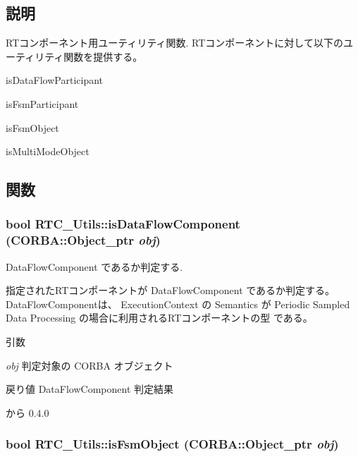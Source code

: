 \subsection{説明}
RTコンポーネント用ユーティリティ関数. RTコンポーネントに対して以下のユーティリティ関数を提供する。


\begin{DoxyItemize}
\item isDataFlowParticipant
\item isFsmParticipant
\item isFsmObject
\item isMultiModeObject 
\end{DoxyItemize}

\subsection{関数}
\subsubsection[{isDataFlowComponent}]{\setlength{\rightskip}{0pt plus 5cm}bool RTC\_\-Utils::isDataFlowComponent (CORBA::Object\_\-ptr {\em obj})}\label{namespaceRTC__Utils_a7615b39670d055183b4dba9a8166c868}


DataFlowComponent であるか判定する. 

指定されたRTコンポーネントが DataFlowComponent であるか判定する。 DataFlowComponentは、 ExecutionContext の Semantics が Periodic Sampled Data Processing の場合に利用されるRTコンポーネントの型 である。


\begin{DoxyParams}{引数}
\item[{\em obj}]判定対象の CORBA オブジェクト\end{DoxyParams}
\begin{DoxyReturn}{戻り値}
DataFlowComponent 判定結果
\end{DoxyReturn}
\begin{DoxySince}{から}
0.4.0 
\end{DoxySince}
\subsubsection[{isFsmObject}]{\setlength{\rightskip}{0pt plus 5cm}bool RTC\_\-Utils::isFsmObject (CORBA::Object\_\-ptr {\em obj})}\label{namespaceRTC__Utils_a467f15e404ab93c70887d0d0e003a67d}


